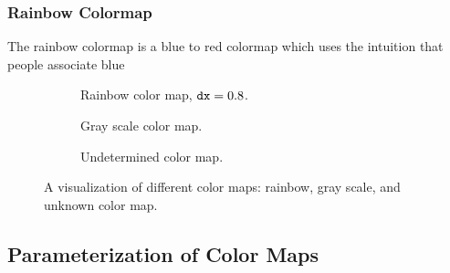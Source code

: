 \subsubsection{Rainbow Colormap} %
\label{ssub:rainbow_colormap}
The rainbow colormap is a blue to red colormap which uses the intuition that people associate blue 
\begin{figure}
	\centering
	\begin{subfigure}{\textwidth}
		\centering
		\caption{Rainbow color map, $\mathtt{dx} = 0.8$.}
		\label{fig:colormapping:intro:differntColorMaps:rainbow}
	\end{subfigure}
	\begin{subfigure}{\textwidth}
		\centering
		\caption{Gray scale color map.}
		\label{fig:colormapping:intro:differntColorMaps:grayscale}
	\end{subfigure}	
	\begin{subfigure}{\textwidth}
		\centering
		\caption{Undetermined color map.}
		\label{fig:colormapping:intro:differntColorMaps:ofChoice}
	\end{subfigure}		
	\caption{A visualization of different color maps:  rainbow,  gray scale, and  unknown color map.}
	\label{fig:colormapping:introduction}
\end{figure}



	

	

\subsection{Parameterization of Color Maps}
\label{ss:colormaps:parameterization}

